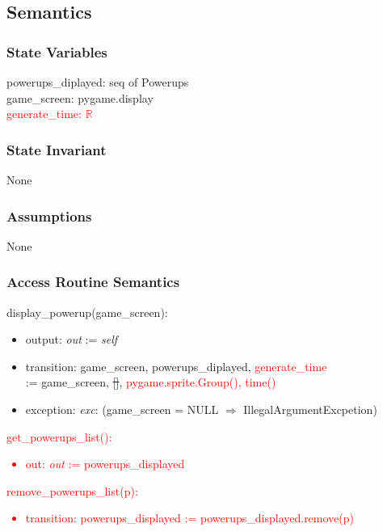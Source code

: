 \documentclass[12pt]{article}
\begin{document}
\subsection* {Semantics}

\subsubsection* {State Variables}

powerups\_diplayed: seq of Powerups\\ 
game\_screen: pygame.display \\
\textcolor{red}{generate\_time: $\mathbb{R}$}

\subsubsection* {State Invariant}

None

\subsubsection* {Assumptions}

None

\subsubsection* {Access Routine Semantics}

display\_powerup(game\_screen):
\begin{itemize}
    \item output: \textit{out} := \textit{self}
    \item transition: game\_screen, powerups\_diplayed, \textcolor{red}{generate\_time} \\:= game\_screen, \sout{[]}, \textcolor{red}{pygame.sprite.Group(), time()}
    \item exception: \textit{exc}: (game\_screen = NULL $\Rightarrow$ IllegalArgumentExcpetion)
\end{itemize}

\noindent \textcolor{red}{get\_powerups\_list(): 
\begin{itemize}
    \item out: \textit{out} := powerups\_displayed
\end{itemize}}

\noindent \textcolor{red}{remove\_powerups\_list(p): 
\begin{itemize}
    \item transition: powerups\_displayed := powerups\_displayed.remove(p)
\end{itemize}}
\end{document}
